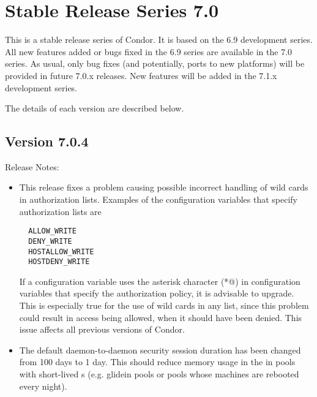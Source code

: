 
\section{\label{sec:History-7-0}Stable Release Series 7.0}

This is a stable release series of Condor.
It is based on the 6.9 development series.
All new features added or bugs fixed in the 6.9 series are available
in the 7.0 series.
As usual, only bug fixes (and potentially, ports to new platforms)
will be provided in future 7.0.x releases.
New features will be added in the 7.1.x development series.

The details of each version are described below.


\subsection*{\label{sec:New-7-0-4}Version 7.0.4}

\noindent Release Notes:

\begin{itemize}

\item This release fixes a problem causing possible incorrect handling
of wild cards in authorization lists.
Examples of the configuration variables that specify
authorization lists are
\begin{verbatim}
  ALLOW_WRITE
  DENY_WRITE
  HOSTALLOW_WRITE
  HOSTDENY_WRITE
\end{verbatim}
If a configuration variable uses the asterisk character
(\verb@*@) in configuration variables that specify the
authorization policy, it is advisable to upgrade.
This is especially true for the 
use of wild cards in any  list,
since this problem could result in
access being allowed, when it should have been denied.
This issue affects all previous versions of Condor.

\item The default daemon-to-daemon security session duration has been
changed from 100 days to 1 day. This should reduce memory usage in the
 in pools with short-lived s (e.g. 
glidein pools or pools whose machines are rebooted every night).

\end{itemize}


